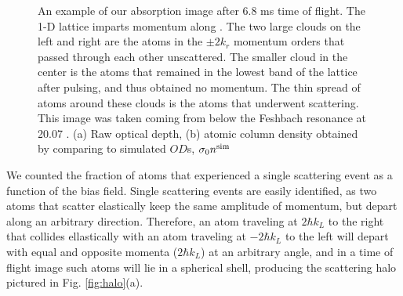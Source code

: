 \documentclass[12pt]{iopart}
\begin{document}
\begin{figure}
\caption{An example of our absorption image after 6.8 ms time of flight. The 1-D lattice imparts momentum along \ex{}. The two large clouds on the left and right are the atoms in the $\pm 2k_r$ momentum orders that passed through each other unscattered. The smaller cloud in the center is the atoms that remained in the lowest band of the lattice after pulsing, and thus obtained no momentum. The thin spread of atoms around these clouds is the atoms that underwent scattering.   This image was taken coming from below the Feshbach resonance at 20.07  \mT{}. (a) Raw optical depth, (b) atomic column density obtained by comparing to simulated $OD$s, $\sigma_0 n^{\rm{sim}}$ }
\label{fig:SampleCorrection}
\end{figure}
\par We counted the fraction of atoms that experienced a single scattering event as a function of the bias field. Single scattering events are easily identified, as two atoms that scatter elastically keep the same amplitude of momentum, but depart along an arbitrary direction. Therefore, an atom traveling at $2 \hbar k_L$ to the right that collides ellastically with an atom traveling at $-2 \hbar k_L$ to the left will depart with equal and opposite momenta ($2 \hbar k_L$) at an arbitrary angle, and in a time of flight image such atoms will lie in a spherical shell, producing the scattering halo pictured in Fig. \ref{fig:halo}(a).
\end{document}
